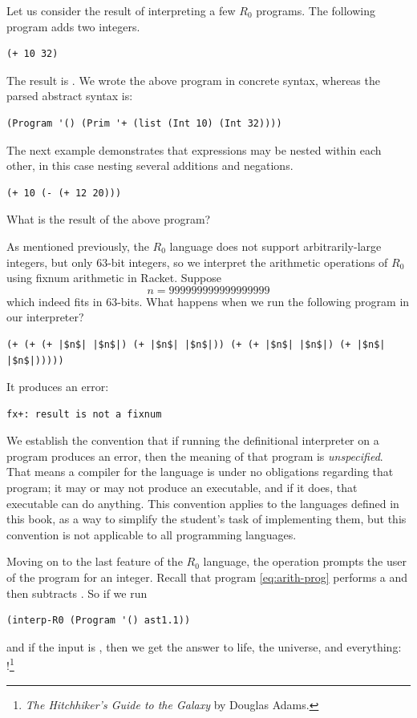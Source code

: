 \documentclass[11pt]{book}
\begin{document}
Let us consider the result of interpreting a few $R_0$ programs. The
following program adds two integers.
\begin{lstlisting}
(+ 10 32)
\end{lstlisting}
The result is .  We wrote the above program in concrete syntax,
whereas the parsed abstract syntax is:
\begin{lstlisting}
(Program '() (Prim '+ (list (Int 10) (Int 32))))
\end{lstlisting}

The next example demonstrates that expressions may be nested within
each other, in this case nesting several additions and negations.
\begin{lstlisting}
(+ 10 (- (+ 12 20)))
\end{lstlisting}
What is the result of the above program?

As mentioned previously, the $R_0$ language does not support
arbitrarily-large integers, but only $63$-bit integers, so we
interpret the arithmetic operations of $R_0$ using fixnum arithmetic
in Racket.
Suppose
\[
  n = 999999999999999999
\]
which indeed fits in $63$-bits.  What happens when we run the
following program in our interpreter?
\begin{lstlisting}
(+ (+ (+ |$n$| |$n$|) (+ |$n$| |$n$|)) (+ (+ |$n$| |$n$|) (+ |$n$| |$n$|)))))
\end{lstlisting}
It produces an error:
\begin{lstlisting}
fx+: result is not a fixnum
\end{lstlisting}
We establish the convention that if running the definitional
interpreter on a program produces an error, then the meaning of that
program is \emph{unspecified}. That means a compiler for the language
is under no obligations regarding that program; it may or may not
produce an executable, and if it does, that executable can do
anything. This convention applies to the languages defined in this
book, as a way to simplify the student's task of implementing them,
but this convention is not applicable to all programming languages.

Moving on to the last feature of the $R_0$ language, the 
operation prompts the user of the program for an integer.  Recall that
program \eqref{eq:arith-prog} performs a  and then subtracts
. So if we run
\begin{lstlisting}
(interp-R0 (Program '() ast1.1))
\end{lstlisting}
and if the input is , then we get the answer to life, the
universe, and everything: !\footnote{\emph{The Hitchhiker's
    Guide to the Galaxy} by Douglas Adams.}
\end{document}
